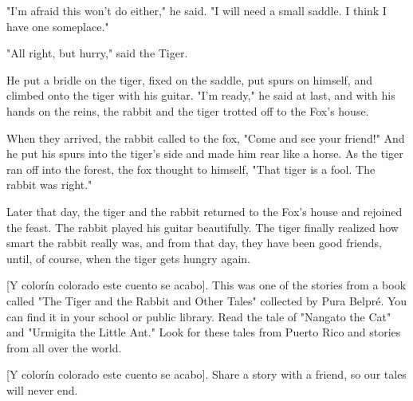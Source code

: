 "I'm afraid this won't do either," he said. "I will need a small saddle. I think I have one someplace."

"All right, but hurry," said the Tiger.

He put a bridle on the tiger, fixed on the saddle, put spurs on himself, and climbed onto the tiger with his guitar. "I'm ready," he said at last, and with his hands on the reins, the rabbit and the tiger trotted off to the Fox's house.

When they arrived, the rabbit called to the fox, "Come and see your friend!" And he put his spurs into the tiger's side and made him rear like a horse. As the tiger ran off into the forest, the fox thought to himself, "That tiger is a fool. The rabbit was right."

Later that day, the tiger and the rabbit returned to the Fox's house and rejoined the feast. The rabbit played his guitar beautifully. The tiger finally realized how smart the rabbit really was, and from that day, they have been good friends, until, of course, when the tiger gets hungry again.

    [Y colorín colorado este cuento se acabo]. This was one of the stories from a book called "The Tiger and the Rabbit and Other Tales" collected by Pura Belpré. You can find it in your school or public library. Read the tale of "Nangato the Cat" and "Urmigita the Little Ant." Look for these tales from Puerto Rico and stories from all over the world.

    [Y colorín colorado este cuento se acabo]. Share a story with a friend, so our tales will never end.

\clearpage
\newpage
